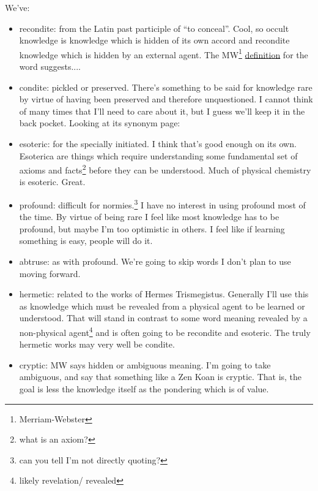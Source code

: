 \documentclass[12pt]{article}
\newcommand{\say}[1]{``#1''}
\renewcommand{\,}{\textsuperscript{,}}
\begin{document}
We've:  
\begin{itemize}

\item recondite: from the Latin past participle of \say{to conceal}.  
Cool, so occult knowledge is knowledge which is hidden of its own accord and recondite knowledge which is hidden by an external agent.  
The MW\footnote{Merriam-Webster} \href{https://www.merriam-webster.com/dictionary/recondite}{definition} for the word suggests....

\item condite: pickled or preserved.  
There's something to be said for knowledge rare by virtue of having been preserved and therefore unquestioned.  
I cannot think of many times that I'll need to care about it, but I guess we'll keep it in the back pocket.  
Looking at its synonym page:

\item esoteric: for the specially initiated.  
I think that's good enough on its own.  
Esoterica are things which require understanding some fundamental set of axioms and facts\footnote{what is an axiom?} before they can be understood.  
Much of physical chemistry is esoteric.  
Great.

\item profound: difficult for normies.\footnote{can you tell I'm not directly quoting?}  
I have no interest in using profound most of the time.  
By virtue of being rare I feel like most knowledge has to be profound, but maybe I'm too optimistic in others.  
I feel like if learning something is easy, people will do it.

\item abtruse: as with profound. We're going to skip words I don't plan to use moving forward.

\item hermetic: related to the works of Hermes Trismegistus. Generally I'll use this as knowledge which must be revealed from a physical agent to be learned or understood.  
That will stand in contrast to some word meaning revealed by a non-physical agent\footnote{likely revelation/ revealed} and is often going to be recondite and esoteric.  
The truly hermetic works may very well be condite.

\item cryptic: MW says hidden or ambiguous meaning. I'm going to take ambiguous, and say that something like a Zen Koan is cryptic.  
That is, the goal is less the knowledge itself as the pondering which is of value.


\end{itemize}
\end{document}
